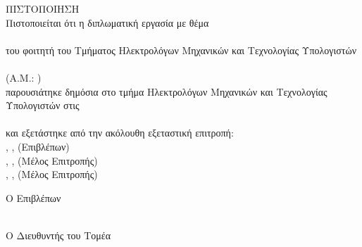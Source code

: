 \pagestyle{empty}
\begin{center}
{\LARGE ΠΙΣΤΟΠΟΙΗΣΗ\\[1cm]}
\large Πιστοποιείται ότι η διπλωματική εργασία με θέμα\\[1cm]
\textbf{\bf \large \doctitle }\\[1cm]
του φοιτητή του Τμήματος Ηλεκτρολόγων Μηχανικών και Τεχνολογίας Υπολογιστών\\[1cm]
\metonoi \\[0.5cm]
(Α.Μ.: \studnum)\\[1cm]
παρουσιάτηκε δημόσια στο τμήμα  Ηλεκτρολόγων Μηχανικών και Τεχνολογίας Υπολογιστών στις\\[1cm]
\Large{\imerominiaExetasis}\\[1cm]
\large και εξετάστηκε από την ακόλουθη εξεταστική επιτροπή:\\[1cm]
\supname, \suptitle, \depECE \space (Επιβλέπων)\\[0.2cm]
\epitropiEna, \epitropiEnaTitle, \depECE \space (Μέλος Επιτροπής)\\[0.2cm]
\epitropiDyo, \epitropiDyoTitle, \depECE \space (Μέλος Επιτροπής)\\[1cm]
\end{center}
\begin{minipage}{0.5\textwidth}
\begin{flushleft} \large
Ο Επιβλέπων\\[0.5cm]
\supname\\
\emph{\suptitle}
\end{flushleft}
\end{minipage}
\begin{minipage}{0.5\textwidth}
\begin{flushright} \large
Ο Διευθυντής του Τομέα\\[0.5cm]
\headofdivision \\
\emph{\headofdivisiontitle}
\end{flushright}
\end{minipage}